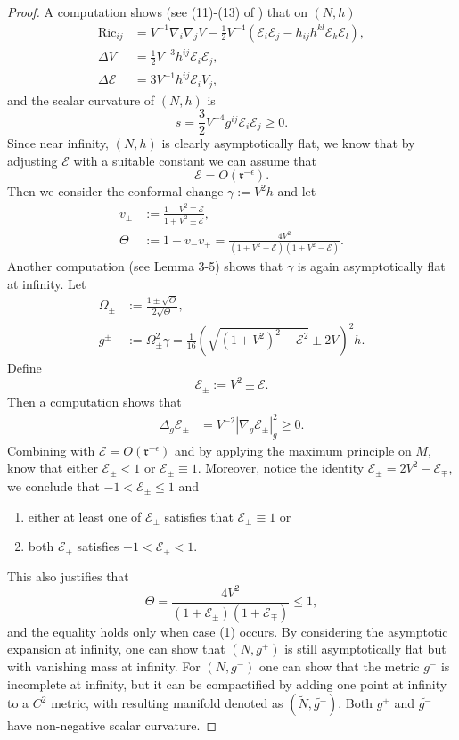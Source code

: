 \documentclass[a4paper,11pt]{amsart}
\theoremstyle{definition}
\numberwithin{equation}{section}
\DeclareMathOperator{\Ric}{Ric}
\begin{document}
\begin{proof}
    A computation shows (see (11)-(13) of \cite{MarsSimon}) that on $(N,h)$
    \begin{align}
        \Ric_{ij}&=V^{-1}\nabla_{i}\nabla_jV-\frac{1}{2}V^{-4}(\mathcal{E}_i\mathcal{E}_j-h_{ij}h^{kl}\mathcal{E}_k\mathcal{E}_l),\\
        \Delta V&=\frac{1}{2}V^{-3}h^{ij}\mathcal{E}_i\mathcal{E}_j,\\
        \Delta\mathcal{E}&=3V^{-1}h^{ij}\mathcal{E}_i V_j,
    \end{align}
    and the scalar curvature of $(N,h)$ is 
    \begin{equation}
        s=\frac{3}{2}V^{-4}g^{ij}\mathcal{E}_i\mathcal{E}_j\geq0.
    \end{equation}
    Since near infinity, $(N,h)$ is clearly asymptotically flat, we know that by adjusting $\mathcal{E}$ with a suitable constant we can assume that 
    $$\mathcal{E}=O(\mathfrak r^{-\epsilon}).$$
    Then we consider the conformal change $\gamma:=V^2h$ 
    and let 
    \begin{align}
        v_{\pm}&:=\frac{1-V^2\mp\mathcal{E}}{1+V^2\pm\mathcal{E}},\\
        \Theta&:=1-v_-v_+=\frac{4V^2}{(1+V^2+\mathcal{E})(1+V^2-\mathcal{E})}.
    \end{align}
    Another computation (see \cite{MarsSimon} Lemma 3-5) shows that $\gamma$ is again asymptotically flat at infinity. Let
    \begin{align}
        \Omega_{\pm}&:=\frac{1\pm\sqrt{\Theta}}{2\sqrt{\Theta}},\\
        g^{\pm}&:=\Omega_{\pm}^2\gamma=\frac{1}{16}(\sqrt{(1+V^2)^2-\mathcal{E}^2}\pm2V)^2h.
    \end{align}
   Define
    $$\mathcal{E}_{\pm}:=V^2\pm\mathcal{E}.$$
   Then a computation shows that
    \begin{align}
        \Delta_{g}\mathcal{E}_{\pm}&=V^{-2}|\nabla_g\mathcal{E}_{\pm}|_g^2\geq0.
    \end{align}
    Combining with $\mathcal{E}=O(\mathfrak{r}^{-\epsilon})$ and by applying the maximum principle on $M$, know that either $\mathcal{E}_{\pm}<1$ or $\mathcal{E}_{\pm}\equiv1$. Moreover, notice the identity $\mathcal{E}_{\pm}=2V^2-\mathcal{E}_{\mp}$, we conclude that $-1<\mathcal{E}_{\pm}\leq1$ and
    \begin{enumerate}
        \item either at least one of $\mathcal{E}_{\pm}$ satisfies that $\mathcal{E}_{\pm}\equiv1$ or
        \item both $\mathcal{E}_{\pm}$ satisfies $-1<\mathcal{E}_{\pm}<1$. 
    \end{enumerate}
    This also justifies that $$\Theta=\frac{4V^2}{(1+\mathcal{E}_{\pm})(1+\mathcal{E}_{\mp})}\leq 1,$$ and the equality holds only when case (1) occurs. By considering the asymptotic expansion at infinity, one can show that $(N,g^+)$ is still asymptotically flat but with vanishing mass at infinity. For $(N,g^-)$ one can show that the metric $g^-$ is incomplete at infinity, but it can be compactified by adding one point at infinity to a $C^2$ metric, with resulting manifold denoted as $(\widetilde{N},\widetilde{g^-})$. Both $g^+$ and $\widetilde{g^-}$ have non-negative scalar curvature. 


\end{proof}
\end{document}

